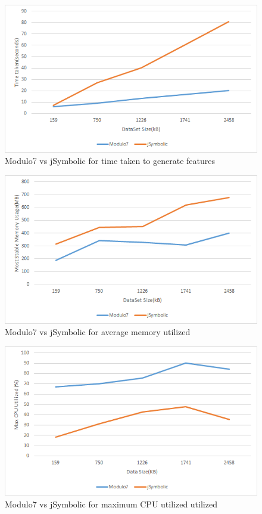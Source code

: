 \begin{figure}[!htb]
\centering
\includegraphics[width=120mm, scale=0.8]{TimeTaken.png}
\makeatletter
\let\@currsize\normalsize
\caption{Modulo7 vs jSymbolic for time taken to generate features}
\label{fig:time}
\end{figure}

\begin{figure} [!htb]
\centering
\includegraphics[width=120mm, scale=0.8]{MemoryTaken.png}
\makeatletter
\let\@currsize\normalsize
\caption{Modulo7 vs jSymbolic for average memory utilized}
\label{fig:mem}
\end{figure}

\begin{figure}[!htb]
\centering
\includegraphics[width=120mm, scale=0.8]{CPUUsage.png}
\makeatletter
\let\@currsize\normalsize
\caption{Modulo7 vs jSymbolic for maximum CPU utilized utilized}
\label{fig:cpu}
\end{figure}

